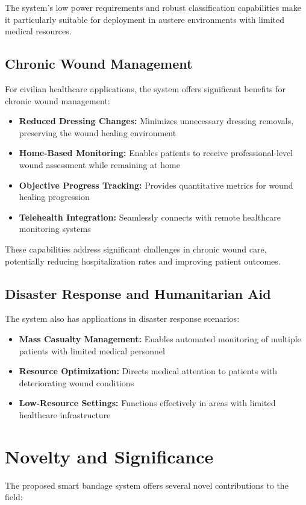 \documentclass[conference]{IEEEtran}
\begin{document}
The system's low power requirements and robust classification capabilities make it particularly suitable for deployment in austere environments with limited medical resources.

\subsection{Chronic Wound Management}
For civilian healthcare applications, the system offers significant benefits for chronic wound management:

\begin{itemize}
    \item \textbf{Reduced Dressing Changes:} Minimizes unnecessary dressing removals, preserving the wound healing environment
    \item \textbf{Home-Based Monitoring:} Enables patients to receive professional-level wound assessment while remaining at home
    \item \textbf{Objective Progress Tracking:} Provides quantitative metrics for wound healing progression
    \item \textbf{Telehealth Integration:} Seamlessly connects with remote healthcare monitoring systems
\end{itemize}

These capabilities address significant challenges in chronic wound care, potentially reducing hospitalization rates and improving patient outcomes.

\subsection{Disaster Response and Humanitarian Aid}
The system also has applications in disaster response scenarios:

\begin{itemize}
    \item \textbf{Mass Casualty Management:} Enables automated monitoring of multiple patients with limited medical personnel
    \item \textbf{Resource Optimization:} Directs medical attention to patients with deteriorating wound conditions
    \item \textbf{Low-Resource Settings:} Functions effectively in areas with limited healthcare infrastructure
\end{itemize}

\section{Novelty and Significance}
The proposed smart bandage system offers several novel contributions to the field:
\end{document}
